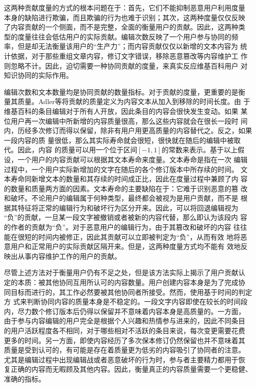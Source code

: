 这两种贡献度量的方式的根本问题在于：首先，它们不能抑制恶意用户利用度量
本身的缺陷进行欺骗，而且欺骗的行为也难于识别；其次，这两种度量仅仅反映
了内容贡献的一个侧面，而不是完整，全面的衡量用户的贡献。因此，这两种类
型的度量往往会低估用户的实际贡献。编辑次数反映了一个用户参与协同的频
率，但是却无法衡量该用户的“生产力”；而内容贡献仅仅以新增的文本内容为
统计依据，对于那些重组文章内容，修订文字错误，移除恶意篡改等内容维护工
作则忽略不计。因此，迫切需要一种协同贡献的度量，来真实反应维基百科用户
对知识协同的实际作用。

编辑次数和文本数量均是协同贡献的数量指标。对于贡献的度量，更重要的是衡
量其质量。Adler等将贡献的质量定义为内容文本从加入到移除的时间长度\cite{Adler2008}。由
于维基百科的条目编辑对于所有人开放，因此条目的内容会很快发生变动。如果
某位用户再一次编辑中所新增的内容质量很高，那么这些内容就会在很长一段时
间内，历经多次修订而得以保留，除非有用户用更高质量的内容替代之。反之，如果一段内容的质
量很低，那么其实际寿命就会很短，很快就在随后的编辑中被取代。因此，内容
的质量可以用一个位于区间$[-1,1]$的常数来表示。基于以上假
设，一个用户的内容贡献可以根据其文本寿命来度量。文本寿命是指在一次
编辑过程中，一个用户实际新增加的文字在随后的各个修订版本中所存续的时间。
文本寿命同新增文本的数量和其存续的时间成正比，因此在度量过程中兼顾了内
容的数量和质量两方面的因素。文本寿命的主要缺陷在于：它难于识别恶意的篡
改和破坏。不论用户的编辑属于何种类型，最终都会被视为是用户贡献，而不是
根据其特征将正常的编辑行为和破坏行为区分开来。因此，可以将回退编辑视为
“负”的贡献，一旦某一段文字被撤销或者被新的内容代替，那么即认为该段内
容的作者的贡献为“负”。对于恶意用户的编辑行为，由于其篡改和破坏的内容
往往能在很短的时间内被修正，因此其贡献可以立即被判定为“负”，从而有效
地将恶意用户和正常用户的实际贡献区隔开来。但是，这两种度量方式均不能有
效地反映出从事内容维护工作的用户的贡献。

尽管上述方法对于衡量用户仍有不足之处，但是该方法实际上揭示了用户贡献认
定的本质：被其他协同互用所认可的内容数量。用户创建内容本身是为了完成协
同目标而进行的，其工作必然要被其他协同者所接受。然而，使用基于时间的判定方
式来判断协同内容的质量本身是不稳定的。一段文字内容即使在较长的时间段
内，尽力数个修订版本后仍得以保留并不意味着内容本身是高质量的。一方面，
由于参与内容编辑的用户完全是根据个人兴趣和热情参与进来的，因此不同条目
的用户活跃程度各不相同，对于哪些相对不活跃的条目来说，每次变更需要花费
更多的时间。另一方面，即使内容经历了多次保本修订仍然保留也并不意味着其
质量是受到认可的，有可能是存在着质量更为低劣的内容吸引了协同者的注意。
尤其是编辑过程中出现编辑战或者恶意破坏的行为时，参与者主要精力都用于恢
复正确的内容而无暇顾及其他内容。因此，衡量真正的内容质量需要一个更稳健、
准确的指标。

